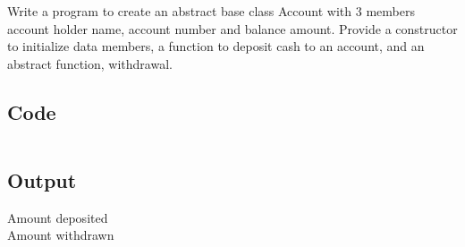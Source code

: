 \documentclass[../main.tex]{subfiles}
\begin{document}
Write a program to create an abstract base class Account with 3 members
account holder name, account number and balance amount. Provide a constructor
to initialize data members, a function to deposit cash to an account, and an
abstract function, withdrawal.

\subsection{Code}
\inputminted[frame=lines, breaklines, breakanywhere, numberblanklines=false]{java}{./programs/prog7/SavingsAccount.java}

\subsection{Output}
Amount deposited  \\
Amount withdrawn \\
\end{document}

